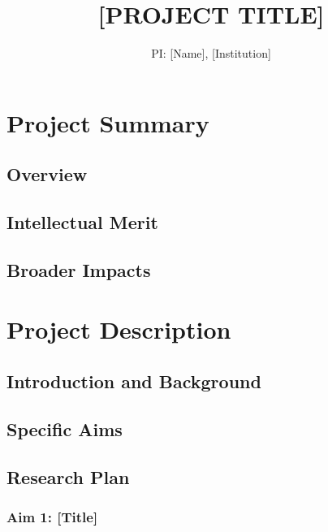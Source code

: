\documentclass[11pt]{article}
\title{[PROJECT TITLE]}
\author{PI: [Name], [Institution]}
\date{}
\begin{document}
\maketitle

\section{Project Summary}

\subsection{Overview}

\subsection{Intellectual Merit}

\subsection{Broader Impacts}

\section{Project Description}

\subsection{Introduction and Background}

\subsection{Specific Aims}

\subsection{Research Plan}

\subsubsection{Aim 1: [Title]}
\end{document}
